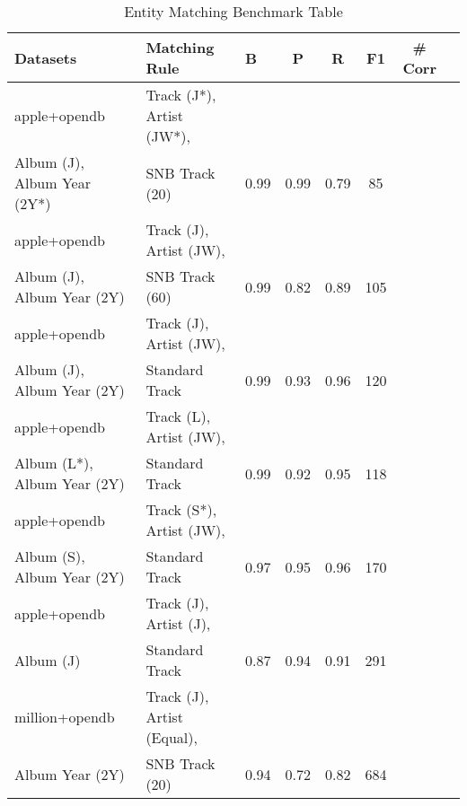 \documentclass[runningheads]{llncs}
\begin{document}
\begin{table}[]
	\small
	\caption{Entity Matching Benchmark Table}
	\label{tab:benchmark}
	\begin{threeparttable}
	\begin{tabular}{lp{4.5cm}p{2cm}ccccc}
		\hline
		\textbf{Datasets}      & \textbf{Matching Rule}                                          & \textbf{B}                          & \textbf{P} & \textbf{R} & \textbf{F1}  & \textbf{\# Corr}  \\\hline
		apple+opendb         & \raggedright Track (J*), Artist (JW*), \\ Album (J), Album Year (2Y*) & \raggedright SNB Track (20)              & 0.99              & 0.99          & 0.79       & 85               \\
		apple+opendb         & \raggedright Track (J), Artist (JW), \\ Album (J), Album Year (2Y) & \raggedright SNB Track (60)              & 0.99             & 0.82          & 0.89       & 105              \\
		\rowcolor[HTML]{FFFFCC} 
		apple+opendb         & \raggedright Track (J), Artist (JW), \\ Album (J), Album Year (2Y) & \raggedright Standard Track                            & 0.99             & 0.93          & 0.96       & 120              \\
		apple+opendb         & \raggedright Track (L), Artist (JW), \\ Album (L*), Album Year (2Y) & \raggedright Standard Track                            & 0.99             & 0.92           & 0.95       & 118              \\
		apple+opendb         & \raggedright Track (S*), Artist (JW),\\  Album (S), Album Year (2Y) & \raggedright Standard Track                            & 0.97             & 0.95          & 0.96       & 170              \\
		apple+opendb         & \raggedright Track (J), Artist (J),\\  Album (J)             & \raggedright Standard Track                            & 0.87             & 0.94          & 0.91       & 291              \\ \hline\hline
		million+opendb       & \raggedright Track (J), Artist (Equal), \\ Album Year (2Y)           & \raggedright SNB Track (20)              & 0.94             & 0.72         & 0.82       & 684              \\

\end{tabular}
\end{threeparttable}
\end{table}
\end{document}
